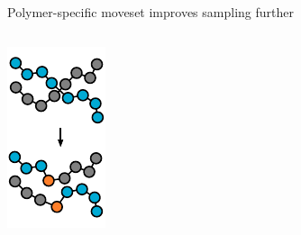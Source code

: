 \documentclass[aspectratio=169]{beamer}
\begin{document}
\begin{frame}[c]{Polymer-specific moveset improves sampling further}
\begin{columns}[T]
{    \includegraphics[width=\textwidth]{figs/dbl_bridge_move.pdf}
    }
  \end{columns}
\end{frame}
\end{document}
